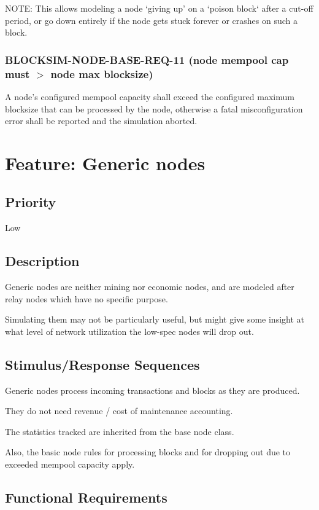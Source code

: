 \documentclass{scrreprt}
\begin{document}
NOTE: This allows modeling a node `giving up' on a `poison block` after a
cut-off period, or go down entirely if the node gets stuck forever or crashes
on such a block.


\subsubsection{BLOCKSIM-NODE-BASE-REQ-11 (node mempool cap must $>$ node max blocksize)}

A node's configured mempool capacity shall exceed the configured
maximum blocksize that can be processed by the node, otherwise a fatal
misconfiguration error shall be reported and the simulation aborted.



\section{Feature: Generic nodes}

\subsection{Priority}

Low

\subsection{Description}

Generic nodes are neither mining nor economic nodes, and are modeled
after relay nodes which have no specific purpose.

Simulating them may not be particularly useful, but might give some
insight at what level of network utilization the low-spec nodes will
drop out.


\subsection{Stimulus/Response Sequences}

Generic nodes process incoming transactions and blocks as they are
produced.

They do not need revenue / cost of maintenance accounting.

The statistics tracked are inherited from the base node class.

Also, the basic node rules for processing blocks and for dropping out due to
exceeded mempool capacity apply.


\subsection{Functional Requirements}
\end{document}
